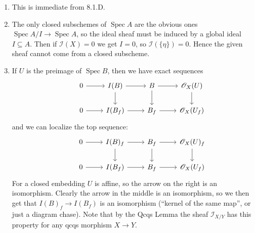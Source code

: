 \documentclass{report}
\newcommand{\I}{\mathscr{I}}
\renewcommand{\O}{\mathscr{O}} %
\DeclareMathOperator{\Spec}{Spec}
\begin{document}
\begin{enumerate}[label=\textbf{8.1.\Alph*.}]
	\item This is immediate from 8.1.D.

	\item The only closed subschemes of $\Spec A$ are the obvious ones
	      $\Spec A/I\to\Spec A$, so the ideal sheaf must be induced by a global
	      ideal $I\subseteq A$. Then if $\I(X)=0$ we get $I=0$, so
	      $\I(\{\eta\})=0$. Hence the given sheaf cannot come from a closed
	      subscheme.

	\item If $U$ is the preimage of $\Spec B$, then we have exact sequences
	      \begin{equation*}
		      \begin{tikzcd}
			      &0 \ar[r] &I(B) \ar[d] \ar[r] &B \ar[r] \ar[d] &\O_X(U) \ar[d] \\
			      &0 \ar[r] &I(B_f) \ar[r] &B_f \ar[r] &\O_X(U_f)
		      \end{tikzcd}
	      \end{equation*}
	      and we can localize the top sequence:
	      \begin{equation*}
		      \begin{tikzcd}
			      &0 \ar[r] &I(B)_f \ar[d] \ar[r] &B_f \ar[r] \ar[d] &\O_X(U)_f \ar[d] \\
			      &0 \ar[r] &I(B_f) \ar[r] &B_f \ar[r] &\O_X(U_f)
		      \end{tikzcd}
	      \end{equation*}
	      For a closed embedding $U$ is affine, so the arrow on the right is an
	      isomorphism. Clearly the arrow in the middle is an isomorphism, so we
	      then get that $I(B)_f\to I(B_f)$ is an isomorphism (``kernel of the same
	      map'', or just a diagram chase). Note that by the Qcqs Lemma the sheaf
	      $\I_{X/Y}$ has this property for any qcqs morphism $X\to Y$.


\end{enumerate}
\end{document}
